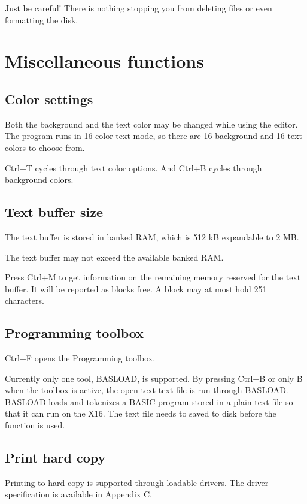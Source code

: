 \documentclass{article}
\begin{document}
        Just be careful! There is nothing stopping you from deleting files or even formatting the
        disk.

\section{Miscellaneous functions}

    \subsection{Color settings}
        Both the background and the text color may be changed while using the editor. 
        The program runs in 16 color text mode, so there are 16 background and 16 text colors to choose from.

        Ctrl+T cycles through text color options.
        And Ctrl+B cycles through background colors.

    \subsection{Text buffer size}
        The text buffer is stored in banked RAM, which is 512 kB expandable to 2 MB.

        The text buffer may not exceed the available banked RAM.

        Press Ctrl+M to get information on the remaining memory reserved for the
        text buffer. It will be reported as blocks free. A block may at most hold 251 characters.
    
    \subsection{Programming toolbox}
        Ctrl+F opens the Programming toolbox.

        Currently only one tool, BASLOAD, is supported. By pressing Ctrl+B or only B when
        the toolbox is active, the open text text file is run through BASLOAD. 
        BASLOAD loads and tokenizes a BASIC program stored in a plain text file so that it 
        can run on the X16. The text file needs to saved to disk before the function is used.

    \subsection{Print hard copy}
        Printing to hard copy is supported through loadable drivers. The driver specification
        is available in Appendix C.
\end{document}
